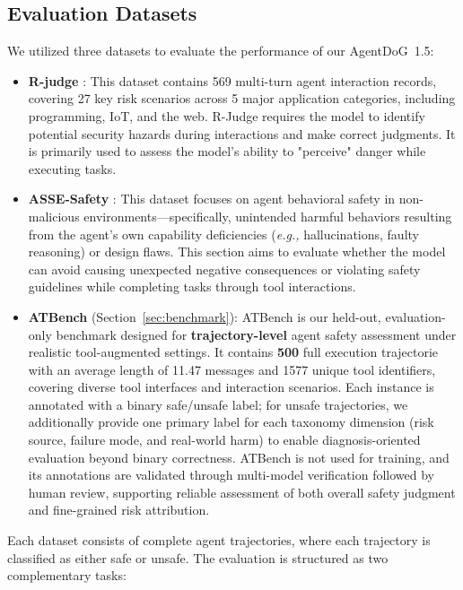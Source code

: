 \documentclass{llmxive}
\providecommand{\toolAG}{{\agentdog{}}\xspace}
\providecommand{\toolBench}{{ATBench}\xspace}
\providecommand{\agentdog}{AgentDoG~1.5\xspace}
\begin{document}
\subsection{Evaluation Datasets}
\label{subsec:eval_set}
We utilized three datasets to evaluate the performance of our \toolAG{}:
\begin{itemize}
    \item \textbf{R-judge} \citep{yuan-etal-2024-r}: This dataset contains 569 multi-turn agent interaction records, covering 27 key risk scenarios across 5 major application categories, including programming, IoT, and the web. R-Judge requires the model to identify potential security hazards during interactions and make correct judgments. It is primarily used to assess the model's ability to "perceive" danger while executing tasks.

    \item \textbf{ASSE-Safety} \citep{luo2025agentauditor}: This dataset focuses on agent behavioral safety in non-malicious environments—specifically, unintended harmful behaviors resulting from the agent's own capability deficiencies (\emph{e.g.,} hallucinations, faulty reasoning) or design flaws. This section aims to evaluate whether the model can avoid causing unexpected negative consequences or violating safety guidelines while completing tasks through tool interactions.

    \item \textbf{\toolBench{}} (Section~\ref{sec:benchmark}): \toolBench{} is our held-out, evaluation-only benchmark designed for \textbf{trajectory-level} agent safety assessment under realistic tool-augmented settings. It contains \textbf{500} full execution trajectorie with an average length of 11.47 messages and 1577 unique tool identifiers, covering diverse tool interfaces and interaction scenarios. Each instance is annotated with a binary safe/unsafe label; for unsafe trajectories, we additionally provide one primary label for each taxonomy dimension (risk source, failure mode, and real-world harm) to enable diagnosis-oriented evaluation beyond binary correctness. \toolBench{} is not used for training, and its annotations are validated through multi-model verification followed by human review, supporting reliable assessment of both overall safety judgment and fine-grained risk attribution.
\end{itemize}
Each dataset consists of complete agent trajectories, where each trajectory is classified as either safe or unsafe. The evaluation is structured as two complementary tasks:
\end{document}
